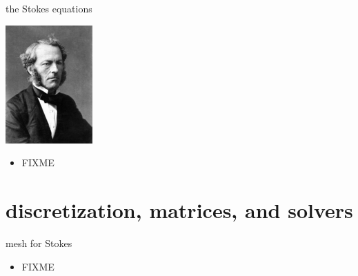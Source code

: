 \documentclass[10pt,hyperref,dvipsnames]{beamer}
\begin{document}
\begin{frame}{the Stokes equations}

\hfill \includegraphics[width=0.25\textwidth]{figs/people/gstokes.jpg}

\vspace{-20mm}
\begin{itemize}
\item FIXME
\end{itemize}
\end{frame}


\section{discretization, matrices, and solvers}

\begin{frame}{mesh for Stokes}

\begin{itemize}
\item FIXME
\begin{center}

\end{center}
\end{itemize}
\end{frame}
\end{document}
